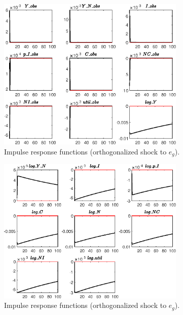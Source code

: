  
\begin{figure}[H]
\centering 
\includegraphics[width=0.80\textwidth]{BRS_imp_mobility_alt/graphs/BRS_imp_mobility_alt_IRF_e_g1}
\caption{Impulse response functions (orthogonalized shock to ${e_g}$).}\label{Fig:IRF:e_g:1}
\end{figure}
 
\begin{figure}[H]
\centering 
\includegraphics[width=0.80\textwidth]{BRS_imp_mobility_alt/graphs/BRS_imp_mobility_alt_IRF_e_g2}
\caption{Impulse response functions (orthogonalized shock to ${e_g}$).}\label{Fig:IRF:e_g:2}
\end{figure}
 
